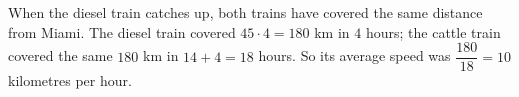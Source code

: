 When the diesel train catches up, both trains have covered the same distance from Miami. The diesel train covered $45\cdot4=180$ km in $4$ hours; the cattle train covered the same $180$ km in $14+4=18$ hours. So its average speed was $\dfrac{180}{18}=\boxed{10}$ kilometres per hour.
